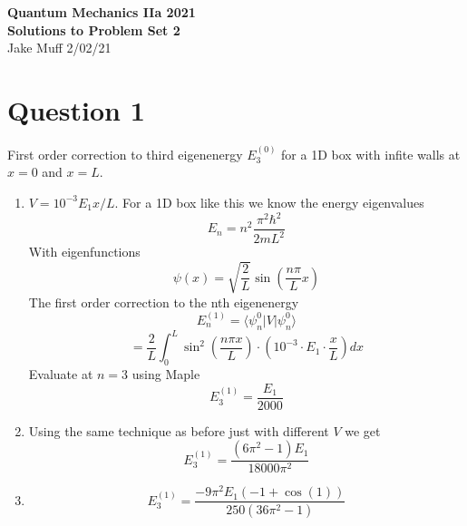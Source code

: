 \documentclass[12pt]{article}
\begin{document}
\normalsize

\baselineskip 14pt

\begin{center}
{\Large {\bf Quantum Mechanics IIa 2021 \ \ \\ Solutions to Problem Set 2}} \\
Jake Muff
2/02/21
\end{center}
\section*{Question 1}
First order correction to third eigenenergy $E_3^{(0)}$ for a 1D box with infite walls at $x=0$ and $x=L$.
\begin{enumerate}
    \item $V= 10^{-3} E_1 x/L$. For a 1D box like this we know the energy eigenvalues 
    $$ E_n = n^2 \frac{ \pi^2 \hbar^2}{2mL^2} $$
    With eigenfunctions 
    $$ \psi (x) = \sqrt{\frac{2}{L}} \sin ( \frac{n \pi}{L} x) $$
    The first order correction to the nth eigenenergy 
    $$ E_n^{(1)} = \langle \psi_n^0 | V | \psi_n^0 \rangle $$
    $$ = \frac{2}{L} \int_0^L \sin^2 (\frac{n \pi x}{L} ) \cdot ( 10^{-3} \cdot E_1 \cdot \frac{x}{L} ) dx $$
    Evaluate at $n=3$ using Maple 
    $$ E_3^{(1)} = \frac{E_1}{2000} $$
    \item Using the same technique as before just with different $V$ we get 
    $$ E_3^{(1)} = \frac{(6 \pi^2 - 1) E_1}{18000 \pi^2} $$
    \item $$ E_3^{(1)} = \frac{ - 9\pi^2 E_1 (-1+ \cos(1)) }{250(36 \pi^2 -1)} $$
\end{enumerate}
\end{document}

